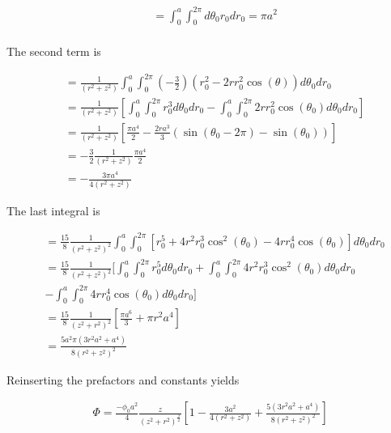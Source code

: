 \documentclass[paper=a4, fontsize=11pt]{scrartcl} %
\numberwithin{equation}{section} %
\numberwithin{figure}{section} %
\numberwithin{table}{section} %
\begin{document}
\begin{align}
&= \int_0^a \int_0^{2 \pi}d\theta_0r_0dr_0 = \pi a^2 \\
\end{align} 



The second term is

\begin{align}
&=\frac{1}{(r^2 + z^2)} \int_0^a \int_0^{2 \pi} \left(-\frac{3}{2}\right)(r_0^2 - 2rr_0^2\cos(\theta))d\theta_0dr_0 \\
&= \frac{1}{(r^2 + z^2)} \left[\int_0^a \int_0^{2 \pi}r_0^3 d\theta_0 dr_0 - \int_0^a \int_0^{2 \pi}2rr_0^2\cos(\theta_0)d\theta_0 dr_0\right] \\
&= \frac{1}{(r^2 + z^2)} \left[\frac{\pi a^4}{2} - \frac{2 r a^3}{3}(\sin(\theta_0 - 2 \pi) - \sin(\theta_0))\right] \\
&= -\frac{3}{2}\frac{1}{(r^2 + z^2)}\frac{\pi a^4}{2} \\
&= -\frac{3\pi a^4}{4(r^2 + z^2)}
\end{align}

The last integral is

\begin{align}
&=\frac{15}{8} \frac{1}{(r^2 + z^2)^2} \int_0^a \int_0^{2 \pi}\left[r_0^5 + 4 r^2 r_0^3\cos^2(\theta_0) - 4 r r_0^4\cos(\theta_0)\right]d\theta_0dr_0 \\
&= \frac{15}{8} \frac{1}{(r^2 + z^2)^2}\bigg[\int_0^a \int_0^{2 \pi}r_0^5 d\theta_0 dr_0 + \int_0^a \int_0^{2 \pi} 4 r^2 r_0^3 \cos^2(\theta_0)d\theta_0dr_0  \\ &  - \int_0^a \int_0^{2 \pi} 4 r r_0^4 \cos(\theta_0)d\theta_0 dr_0\bigg] \\
&= \frac{15}{8}\frac{1}{(z^2 + r^2)^2}\left[\frac{\pi a^6}{3} + \pi r^2 a^4\right] \\
&= \frac{5a^2 \pi (3r^2 a^2 + a^4)}{8 (r^2 + z^2)^2}
\end{align}

Reinserting the prefactors and constants yields

\begin{align}
\Phi = \frac{-\phi_0  a^2}{4} \frac{z}{(z^2 + r^2)^{\frac{3}{2}}}\left[1 - \frac{3 a^2}{4(r^2 + z^2)} + \frac{5(3 r^2 a^2 + a^4)}{8(r^2 + z^2)^2}\right]
\end{align}

\end{document}
